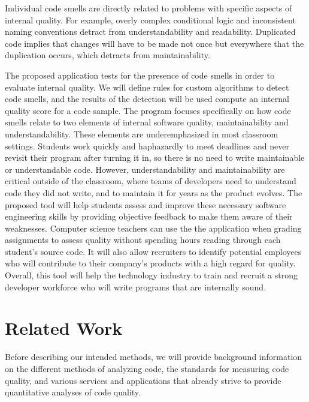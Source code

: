 \documentclass{sig-alternate}
\begin{document}
Individual code smells are directly related to problems with specific aspects of internal quality. For example, overly complex conditional logic and inconsistent naming conventions detract from understandability and readability. Duplicated code implies that changes will have to be made not once but everywhere that the duplication occurs, which detracts from maintainability. 

The proposed application tests for the presence of code smells in order to evaluate internal quality. We will define rules for custom algorithms to detect code smells, and the results of the detection will be used compute an internal quality score for a code sample. The program focuses specifically on how code smells relate to two elements of internal software quality, maintainability and understandability. These elements are underemphasized in most classroom settings. Students work quickly and haphazardly to meet deadlines and never revisit their program after turning it in, so there is no need to write maintainable or understandable code.  However, understandability and maintainability are critical outside of the classroom, where teams of developers need to understand code they did not write, and to maintain it for years as the product evolves. The proposed tool will help students assess and improve these necessary software engineering skills by providing objective feedback to make them aware of their weaknesses. Computer science teachers can use the the application when grading assignments to assess quality without spending hours reading through each student's source code. It will also allow recruiters to identify potential employees who will contribute to their company's products with a high regard for quality. Overall, this tool will help the technology industry to train and recruit a strong developer workforce who will write programs that are internally sound. 

\section{Related Work}
\label{sec:related_work}
Before describing our intended methods, we will provide background information on the different methods of analyzing code, the standards for measuring code quality, and various services and applications that already strive to provide quantitative analyses of code quality.
\end{document}
